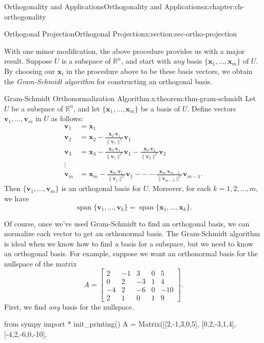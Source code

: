 \documentclass[oneside,10pt,]{book}
\numberwithin{equation}{section}
\newcommand{\spn}{\operatorname{span}}
\newcommand{\bbm}{\begin{bmatrix}}
\newcommand{\ebm}{\end{bmatrix}}
\newcommand{\R}{\mathbb{R}}
\newcommand{\dotp}{\!\boldsymbol{\cdot}\!}
\newcommand{\len}[1]{\lVert #1\rVert}
\newcommand{\vv}{\mathbf{v}}
\newcommand{\xx}{\mathbf{x}}
\newcommand{\amp}{&}
\begin{document}
\begin{chapterptx}{Orthogonality and Applications}{}{Orthogonality and Applications}{}{}{x:chapter:ch-orthogonality}
\begin{sectionptx}{Orthogonal Projection}{}{Orthogonal Projection}{}{}{x:section:sec-ortho-projection}
\par
With one minor modification, the above procedure provides us with a major result. Suppose \(U\) is a subspace of \(\R^n\), and start with \emph{any} basis \(\{\xx_1,\ldots, \xx_m\}\) of \(U\). By choosing our \(\xx_i\) in the procedure above to be these basis vectors, we obtain the \emph{Gram-Schmidt algorithm} for constructing an orthogonal basis.%
\begin{theorem}{Gram-Schmidt Orthonormalization Algorithm.}{}{x:theorem:thm-gram-schmidt}%
Let \(U\) be a subspace of \(\R^n\), and let \(\{\xx_1,\ldots, \xx_m\}\) be a basis of \(U\). Define vectors \(\vv_1,\ldots, \vv_m\) in \(U\) as follows:%
\begin{align*}
\vv_1 \amp = \xx_1 \\
\vv_2 \amp = \xx_2 - \frac{\xx_2\dotp\vv_1}{\len{\vv_1}^2}\vv_1\\
\vv_3 \amp = \xx_3 - \frac{\xx_3\dotp\vv_1}{\len{\vv_1}^2}\vv_1-\frac{\xx_3\dotp\vv_2}{\len{\vv_2}^2}\vv_2\\
\vdots \amp \\
\vv_m \amp = \xx_m - \frac{\xx_m\dotp\vv_1}{\len{\vv_1}^2}\vv_1-\cdots - \frac{\xx_m\dotp\vv_{m-1}}{\len{\vv_{m-1}}^2}\vv_{m-1}\text{.}
\end{align*}
Then \(\{\vv_1,\ldots, \vv_m\}\) is an orthogonal basis for \(U\). Moreover, for each \(k=1,2,\ldots, m\), we have%
\begin{equation*}
\spn\{\vv_1,\ldots, \vv_k\} = \spn\{\xx_1,\ldots, \xx_k\}\text{.}
\end{equation*}
%
\end{theorem}
Of course, once we've used Gram-Schmidt to find an orthogonal basis, we can normalize each vector to get an orthonormal basis. The Gram-Schmidt algorithm is ideal when we know how to find \emph{a} basis for a subspace, but we need to know an orthogonal basis. For example, suppose we want an orthonormal basis for the nullspace of the matrix%
\begin{equation*}
A = \bbm 2 \amp -1 \amp 3 \amp 0 \amp 5\\0 \amp 2 \amp -3  \amp 1 \amp 4\\ -4 \amp 2 \amp -6 \amp 0 \amp -10\\ 2 \amp 1 \amp 0 \amp 1 \amp 9\ebm\text{.}
\end{equation*}
First, we find \emph{any} basis for the nullspace.%
\begin{sageinput}
from sympy import *
init_printing()
A = Matrix([[2,-1,3,0,5],
            [0,2,-3,1,4],
            [-4,2,-6,0,-10],

\end{sageinput}
\end{sectionptx}
\end{chapterptx}
\end{document}
